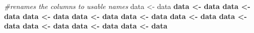 \documentclass[
]{article}
\newenvironment{Shaded}{\begin{snugshade}}{\end{snugshade}}
\newcommand{\CommentTok}[1]{\textcolor[rgb]{0.56,0.35,0.01}{\textit{#1}}}
\newcommand{\KeywordTok}[1]{\textcolor[rgb]{0.13,0.29,0.53}{\textbf{#1}}}
\newcommand{\NormalTok}[1]{#1}
\newcommand{\OperatorTok}[1]{\textcolor[rgb]{0.81,0.36,0.00}{\textbf{#1}}}
\newcommand{\StringTok}[1]{\textcolor[rgb]{0.31,0.60,0.02}{#1}}
\begin{document}
\begin{Shaded}
\begin{Highlighting}[]
\CommentTok{#renames the columns to usable names}
\NormalTok{data <-}\StringTok{ }\NormalTok{data }\OperatorTok{%>%}\StringTok{ }\KeywordTok{rename}\NormalTok{(}\StringTok{"ID"}\NormalTok{ =}\StringTok{ "Participant.no."}\NormalTok{)}
\NormalTok{data <-}\StringTok{ }\NormalTok{data }\OperatorTok{%>%}\StringTok{ }\KeywordTok{rename}\NormalTok{(}\StringTok{"PC"}\NormalTok{ =}\StringTok{ "I.felt.in.control.of.the.fisherman.s.actions."}\NormalTok{)}
\NormalTok{data <-}\StringTok{ }\NormalTok{data }\OperatorTok{%>%}\StringTok{ }\KeywordTok{rename}\NormalTok{(}\StringTok{"R_PC"}\NormalTok{ =}\StringTok{ "I.felt.in.control.....while.trying.to.reel.in.the.fish..performing.the.key.sequence..."}\NormalTok{)}
\NormalTok{data <-}\StringTok{ }\NormalTok{data }\OperatorTok{%>%}\StringTok{ }\KeywordTok{rename}\NormalTok{(}\StringTok{"T_PC"}\NormalTok{ =}\StringTok{ "I.felt.in.control..0...when.the.fish.was.tugging.away.from.me..moving.a.column.away..."}\NormalTok{)}
\NormalTok{data <-}\StringTok{ }\NormalTok{data }\OperatorTok{%>%}\StringTok{ }\KeywordTok{rename}\NormalTok{(}\StringTok{"E_PC"}\NormalTok{ =}\StringTok{ "I.felt.in.control.....when.the.fish.escaped.."}\NormalTok{)}
\NormalTok{data <-}\StringTok{ }\NormalTok{data }\OperatorTok{%>%}\StringTok{ }\KeywordTok{rename}\NormalTok{(}\StringTok{"Compare_PC"}\NormalTok{ =}\StringTok{ "In.this.condition..."}\NormalTok{)}
\NormalTok{data <-}\StringTok{ }\NormalTok{data }\OperatorTok{%>%}\StringTok{ }\KeywordTok{rename}\NormalTok{(}\StringTok{"FR"}\NormalTok{ =}\StringTok{ "How.much.frustration.did.you.feel.....during.this.condition.."}\NormalTok{)}
\NormalTok{data <-}\StringTok{ }\NormalTok{data }\OperatorTok{%>%}\StringTok{ }\KeywordTok{rename}\NormalTok{(}\StringTok{"OFR"}\NormalTok{ =}\StringTok{ "How.much.frustration.did.you.feel.....overall.since.we.started.the.experiment.."}\NormalTok{)}
\NormalTok{data <-}\StringTok{ }\NormalTok{data }\OperatorTok{%>%}\StringTok{ }\KeywordTok{rename}\NormalTok{(}\StringTok{"R_FR"}\NormalTok{ =}\StringTok{ "How.much.frustration.did.you.feel.....while.you.were.trying.to.reel.in.the.fish..perform.the.key.sequence.."}\NormalTok{)}
\NormalTok{data <-}\StringTok{ }\NormalTok{data }\OperatorTok{%>%}\StringTok{ }\KeywordTok{rename}\NormalTok{(}\StringTok{"T_FR"}\NormalTok{ =}\StringTok{ "How.much.frustration.did.you.feel.....while.the.fish.was.tugging.away.from.you..moving.a.column.away.."}\NormalTok{)}
\NormalTok{data <-}\StringTok{ }\NormalTok{data }\OperatorTok{%>%}\StringTok{ }\KeywordTok{rename}\NormalTok{(}\StringTok{"E_FR"}\NormalTok{ =}\StringTok{ "How.much.frustration.did.you.feel.....when.the.fish.escaped.."}\NormalTok{)}
}}}}}}}}}}}
\end{Highlighting}
\end{Shaded}
\end{document}
